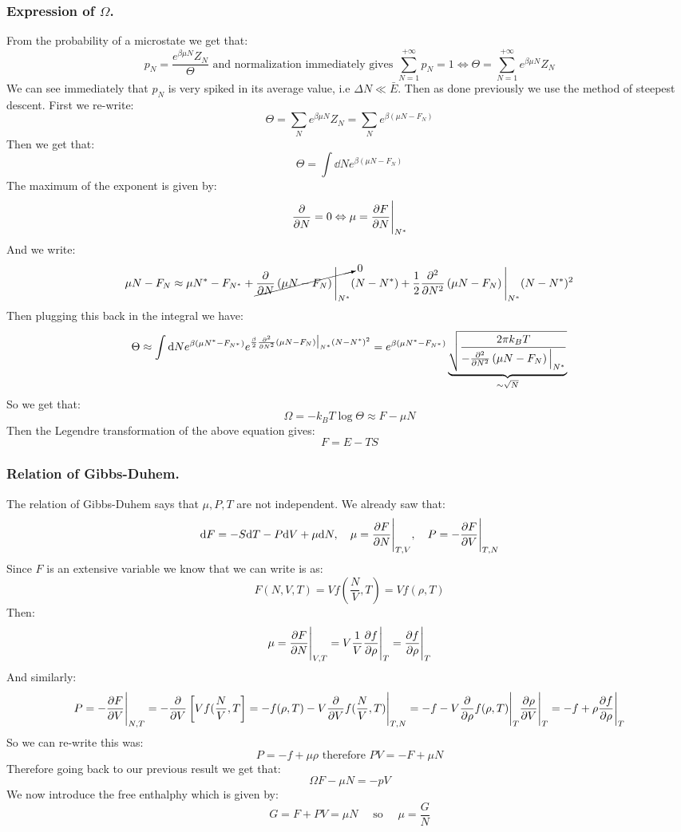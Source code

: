 \documentclass[10pt,a4paper]{book}
\begin{document}
\subsubsection{Expression of $\Omega$.}
From the probability of a microstate we get that:
\[
p_N = \frac{e^{\beta \mu N} Z_N}{\Theta} \text{ and normalization immediately gives } \sum_{N = 1}^{+\infty} p_N = 1 \Leftrightarrow \Theta = \sum_{N = 1}^{+\infty} e^{\beta \mu N} Z_N
\]
We can see immediately that $p_N$ is very spiked in its average value, i.e $\Delta N \ll \bar{E}$. Then as done previously we use the method of steepest descent. First we re-write:
\[
\Theta = \sum_N e^{\beta \mu N} Z_N = \sum_N e^{\beta (\mu N - F_N)}
\]
Then we get that:
\[
\Theta = \int \dd N e^{\beta (\mu N - F_N)}
\]
The maximum of the exponent is given by:
\[
\pdv{}{N} (\mu N - F_N) = 0 \Leftrightarrow \mu = \pdv{F}{N}\Bigg|_{N^*}
\]
And we write:
\[
\mu N - F_N \approx \mu N^* - F_{N^*} + \cancelto{0}{\pdv{}{N} \left(\mu N - F_N\right) \Bigg|_{N^*}}(N - N^*) + \frac{1}{2} \pdv[2]{}{N}\left(\mu N - F_N\right) \Bigg|_{N^*}(N-N^*)^2
\]
Then plugging this back in the integral we have:
\[
\Theta \approx \int\dd N e^{\beta (\mu N^* - F_{N^*})} e^{\frac{\beta}{2}\pdv[2]{}{N} \left(\mu N - F_N\right)\big|_{N^*} (N - N^*)^2} = e^{\beta(\mu N^* - F_{N^*})} \underbrace{\sqrt{\frac{2\pi k_B T}{-\pdv[2]{}{N} \left(\mu N - F_N\right)\Big|_{N^*}}}}_{\sim \sqrt{N}}
\]
So we get that:
\[
\Omega = - k_B T \log \Theta  \approx F - \mu N
\]
Then the Legendre transformation of the above equation gives:
\[
F = E - TS
\]
\subsubsection{Relation of Gibbs-Duhem.}
The relation of Gibbs-Duhem says that $\mu, P, T$ are not independent. We already saw that:
\[
\dd F = - S \dd T - P \dd V + \mu \dd N, \quad \mu = \pdv{F}{N}\Bigg|_{T,V}, \quad P = -\pdv{F}{V}\Bigg|_{T,N}
\]
Since $F$ is an extensive variable we know that we can write is as:
\[
F(N,V,T) = Vf(\frac{N}{V}, T) = V f(\rho, T)
\]
Then:
\[
\mu = \pdv{F}{N}\Bigg|_{V,T} = V\frac{1}{V}\pdv{f}{\rho}\Bigg|_T = \pdv{f}{\rho}\Bigg|_T
\]
And similarly:
\[
P = - \pdv{F}{V}\Bigg|_{N,T} = -\pdv{}{V}\left[V f(\frac{N}{V}, T\right] = -f(\rho, T) - V \pdv{}{V} f(\frac{N}{V}, T)\Bigg|_{T, N} = -f - V \pdv{}{\rho} f(\rho, T)\Bigg|_T \pdv{\rho}{V} \Bigg|_T = -f + \rho \pdv{f}{\rho}\Bigg|_T
\]
So we can re-write this was:
\[
P = - f + \mu \rho \text{ therefore } PV = -F + \mu N
\]
Therefore going back to our previous result we get that:
\[
\Omega F - \mu N = - pV
\]
We now introduce the free enthalphy which is given by:
\[
G = F + PV = \mu N \quad \text{ so } \quad \mu = \frac{G}{N}
\]
\end{document}
